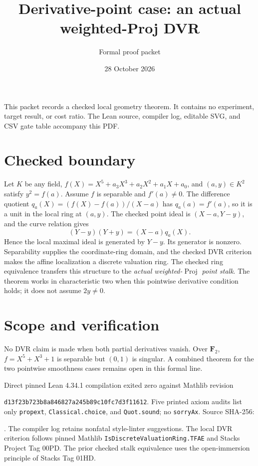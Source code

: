 \documentclass[11pt]{article}
\title{Derivative-point case: an actual weighted-Proj DVR}
\author{Formal proof packet}
\date{28 October 2026}
\begin{document}
\maketitle
\noindent This packet records a checked local geometry theorem. It contains no experiment, target result, or cost ratio. The Lean source, compiler log, editable SVG, and CSV gate table accompany this PDF.

\section*{Checked boundary}
Let $K$ be any field, $f(X)=X^5+a_3X^3+a_2X^2+a_1X+a_0$, and $(a,y)\in K^2$ satisfy $y^2=f(a)$. Assume $f$ is separable and $f'(a)\ne0$. The difference quotient $q_a(X)=(f(X)-f(a))/(X-a)$ has $q_a(a)=f'(a)$, so it is a unit in the local ring at $(a,y)$. The checked point ideal is $(X-a,Y-y)$, and the curve relation gives
\[
  (Y-y)(Y+y)=(X-a)q_a(X).
\]
Hence the local maximal ideal is generated by $Y-y$. Its generator is nonzero. Separability supplies the coordinate-ring domain, and the checked DVR criterion makes the affine localization a discrete valuation ring. The checked ring equivalence transfers this structure to the \emph{actual weighted-$\operatorname{Proj}$ point stalk}. The theorem works in characteristic two when this pointwise derivative condition holds; it does not assume $2y\ne0$.

\section*{Scope and verification}
No DVR claim is made when both partial derivatives vanish. Over $\mathbf F_2$, $f=X^5+X^3+1$ is separable but $(0,1)$ is singular. A combined theorem for the two pointwise smoothness cases remains open in this formal line.

Direct pinned Lean 4.34.1 compilation exited zero against Mathlib revision
\par\noindent\texttt{d13f23b723b8a846827a245b89c10fc7d3f11612}.
Five printed axiom audits list only \texttt{propext}, \texttt{Classical.choice}, and \texttt{Quot.sound}; no \texttt{sorryAx}. Source SHA-256:
\par{}.
The compiler log retains nonfatal style-linter suggestions. The local DVR criterion follows pinned Mathlib \texttt{IsDiscreteValuationRing.TFAE} and Stacks Project Tag 00PD. The prior checked stalk equivalence uses the open-immersion principle of Stacks Tag 01HD.
\end{document}
